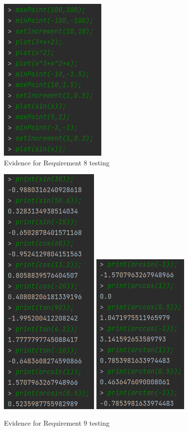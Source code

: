 \documentclass[a4paper, oneside, 11pt]{report}
\begin{document}
\begin{figure}
\includegraphics{Requirement 8.PNG}
\caption{Evidence for Requirement 8 testing}
\end{figure}

\begin{figure}
\includegraphics{Requirement 9A.PNG}
\includegraphics{Requirement 9B.PNG}
\caption{Evidence for Requirement 9 testing}
\end{figure}
\end{document}
